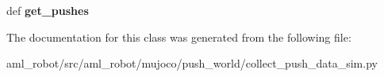 \begin{DoxyCompactItemize}
\item 
\hypertarget{classaml__robot_1_1mujoco_1_1push__world_1_1collect__push__data__sim_1_1_box_object_af61b690b7974ec13358052da7c34267b}{def {\bfseries get\-\_\-pushes}}\label{classaml__robot_1_1mujoco_1_1push__world_1_1collect__push__data__sim_1_1_box_object_af61b690b7974ec13358052da7c34267b}

\end{DoxyCompactItemize}


The documentation for this class was generated from the following file\-:\begin{DoxyCompactItemize}
\item 
aml\-\_\-robot/src/aml\-\_\-robot/mujoco/push\-\_\-world/collect\-\_\-push\-\_\-data\-\_\-sim.\-py\end{DoxyCompactItemize}
